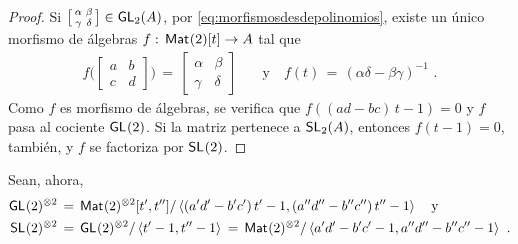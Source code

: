 \begin{proof}
	Si
	\begin{math}
		\big[\begin{smallmatrix}
			\alpha & \beta \\ \gamma & \delta
		\end{smallmatrix}\big]\in\GL[2](A)
	\end{math}, por \eqref{eq:morfismosdesdepolinomios}, existe un
	\'{u}nico morfismo de \'{a}lgebras $f:\,\MM(2)[t]\rightarrow A$ tal que
	\begin{align*}
		f\Big(\begin{bmatrix} a & b \\ c & d \end{bmatrix}\Big) \,=\,
			\begin{bmatrix}
				\alpha & \beta \\ \gamma & \delta
			\end{bmatrix} & \quad\text{y}\quad
		f(t)\,=\,(\alpha\delta-\beta\gamma)^{-1}
		\text{ .}
	\end{align*}
	Como $f$ es morfismo de \'{a}lgebras, se verifica que
	\begin{math}
		f((ad-bc)\,t-1)=0
	\end{math} y $f$ pasa al cociente $\GL(2)$. Si la matriz pertenece a
	$\SL[2](A)$, entonces $f(t-1)=0$, tambi\'{e}n, y $f$ se factoriza por
	$\SL(2)$.
\end{proof}

Sean, ahora,
\begin{align*}
	\GL(2)^{\otimes 2} & \,=\,\MM(2)^{\otimes 2}[t',t'']/
		\generado{(a'd'-b'c')\,t'-1,(a''d''-b''c'')\,t''-1}
		\quad\text{y} \\
	\SL(2)^{\otimes 2} & \,=\,\GL(2)^{\otimes 2}/\generado{t'-1,t''-1}
		\,=\,\MM(2)^{\otimes 2}/\generado{a'd'-b'c'-1,a''d''-b''c''-1}
	\text{ .}
\end{align*}
%

